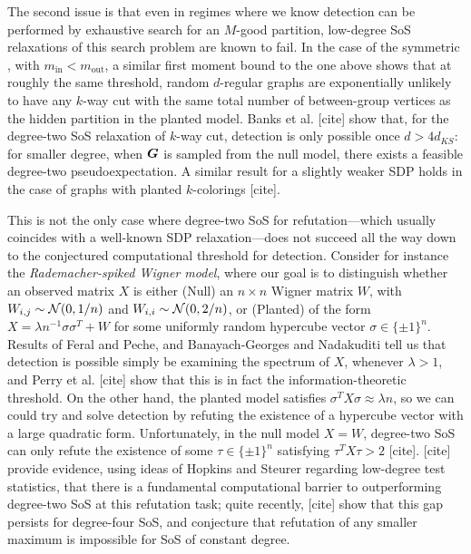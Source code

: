 The second issue is that even in regimes where we know detection can be performed by exhaustive search for an $M$-good partition, low-degree SoS relaxations of this search problem are known to fail. In the case of the symmetric \model, with $m_{\text{in}} < m_{\text{out}}$, a similar first moment bound to the one above shows that at roughly the same threshold, random $d$-regular graphs are exponentially unlikely to have any $k$-way cut with the same total number of between-group  vertices as the hidden partition in the planted model. Banks et al. [cite] show that, for the degree-two SoS relaxation of $k$-way cut, detection is only possible once $d> 4d_{KS}$: for smaller degree, when $\boldsymbol{G}$ is sampled from the null model, there exists a feasible degree-two pseudoexpectation. A similar result for a slightly weaker SDP holds in the case of \ER graphs with planted $k$-colorings [cite]. 

This is not the only case where degree-two SoS for refutation---which usually coincides with a well-known SDP relaxation---does not succeed all the way down to the conjectured computational threshold for detection.    Consider for instance the \emph{Rademacher-spiked Wigner model}, where our goal is to distinguish whether an observed matrix $X$ is either (Null) an $n\times n$ Wigner matrix $W$, with $W_{i,j} \sim \mathcal{N}(0,1/n)$ and $W_{i,i} \sim \mathcal{N}(0,2/n)$, or (Planted) of the form $X = \lambda n^{-1} \sigma\sigma^T + W$ for some uniformly random hypercube vector $\sigma \in \{\pm 1\}^n$. Results of Feral and Peche, and Banayach-Georges and Nadakuditi  tell us that detection is possible simply be examining the spectrum of $X$, whenever $\lambda > 1$, and Perry et al. [cite] show that this is in fact the information-theoretic threshold. On the other hand, the planted model satisfies $\sigma^T X \sigma \approx \lambda n$, so we can  could try and solve detection by refuting the existence of a hypercube vector with a large quadratic form. Unfortunately, in the null model $X = W$, degree-two SoS can only refute the existence of some $\tau \in \{\pm 1\}^n$ satisfying $\tau^T X \tau >2$ [cite]. [cite] provide evidence, using ideas of Hopkins and Steurer regarding low-degree test statistics, that there is a fundamental computational barrier to outperforming degree-two SoS at this refutation task; quite recently, [cite] show that this gap persists for degree-four SoS, and conjecture that refutation of any smaller maximum is impossible for SoS of constant degree.

